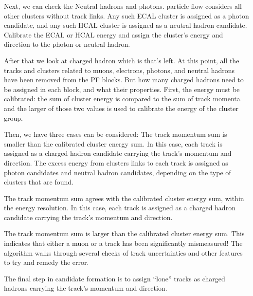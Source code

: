 Next, we can check the Neutral hadrons and photons. particle flow considers all other clusters without track links. Any such ECAL cluster is assigned as a photon candidate, and any such HCAL cluster is assigned as a neutral hadron candidate. Calibrate the ECAL or HCAL energy and assign the cluster’s energy and direction to the photon or neutral hadron. 

After that we look at charged hadron which is that’s left. At this point, all the tracks and clusters related to muons, electrons, photons, and neutral hadrons have been removed from the PF blocks.  But how many charged hadrons need to be assigned in each block, and what their properties. First, the energy must be calibrated: the sum of cluster energy is compared to the sum of track momenta and the larger of those two values is used to calibrate the energy of the cluster group.   

Then, we have three cases can be considered: The track momentum sum is smaller than the calibrated cluster energy sum. In this case, each track is assigned as a charged hadron candidate carrying the track’s momentum and direction. The excess energy from clusters links to each track is assigned as photon candidates and neutral hadron candidates, depending on the type of clusters that are found.  

The track momentum sum agrees with the calibrated cluster energy sum, within the energy resolution.  In this case, each track is assigned as a charged hadron candidate carrying the track’s momentum and direction.  

The track momentum sum is larger than the calibrated cluster energy sum. This indicates that either a muon or a track has been significantly mismeasured! The algorithm walks through several checks of track uncertainties and other features to try and remedy the error. 

The final step in candidate formation is to assign “lone” tracks as charged hadrons carrying the track’s momentum and direction. 




